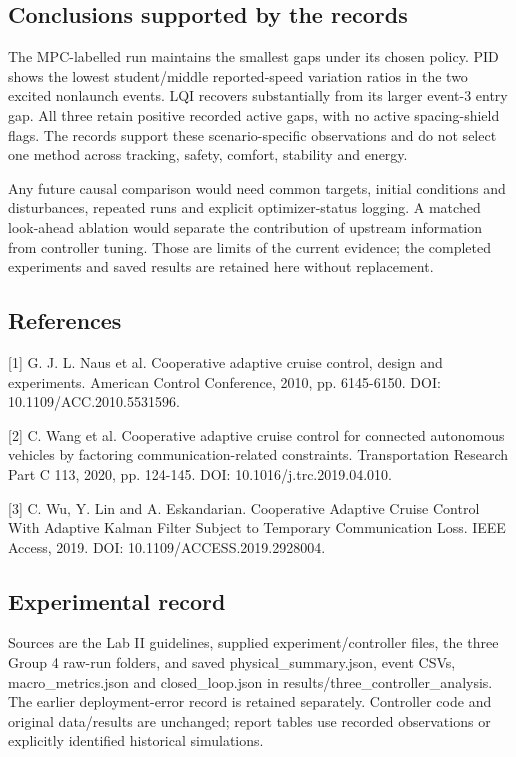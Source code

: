 \documentclass[11pt,a4paper]{article}
\begin{document}
\subsection*{Conclusions supported by the records}

The MPC-labelled run maintains the smallest gaps under its chosen policy. PID shows the lowest student/middle reported-speed variation ratios in the two excited nonlaunch events. LQI recovers substantially from its larger event-3 entry gap. All three retain positive recorded active gaps, with no active spacing-shield flags. The records support these scenario-specific observations and do not select one method across tracking, safety, comfort, stability and energy.


Any future causal comparison would need common targets, initial conditions and disturbances, repeated runs and explicit optimizer-status logging. A matched look-ahead ablation would separate the contribution of upstream information from controller tuning. Those are limits of the current evidence; the completed experiments and saved results are retained here without replacement.


\subsection*{References}

[1] G. J. L. Naus et al. Cooperative adaptive cruise control, design and experiments. American Control Conference, 2010, pp. 6145-6150. DOI: 10.1109/ACC.2010.5531596.


[2] C. Wang et al. Cooperative adaptive cruise control for connected autonomous vehicles by factoring communication-related constraints. Transportation Research Part C 113, 2020, pp. 124-145. DOI: 10.1016/j.trc.2019.04.010.


[3] C. Wu, Y. Lin and A. Eskandarian. Cooperative Adaptive Cruise Control With Adaptive Kalman Filter Subject to Temporary Communication Loss. IEEE Access, 2019. DOI: 10.1109/ACCESS.2019.2928004.


\subsection*{Experimental record}

Sources are the Lab II guidelines, supplied experiment/controller files, the three Group 4 raw-run folders, and saved physical\_summary.json, event CSVs, macro\_metrics.json and closed\_loop.json in results/three\_controller\_analysis. The earlier deployment-error record is retained separately. Controller code and original data/results are unchanged; report tables use recorded observations or explicitly identified historical simulations.
\end{document}

